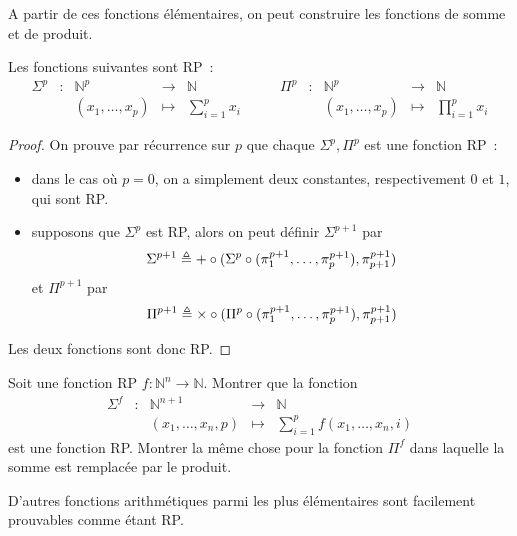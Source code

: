 A partir de ces fonctions élémentaires, on peut construire les fonctions de
somme et de produit.

\begin{proposition}
  Les fonctions suivantes sont RP~:
  \[
  \begin{array}{ccccc}
    \Sigma^p &: & \mathbb N^p &\longrightarrow & \mathbb N \\
    & & (x_1,\ldots,x_p) &\longmapsto & \sum_{i = 1}^p x_i
  \end{array}\qquad
  \begin{array}{ccccc}
    \Pi^p &: & \mathbb N^p &\longrightarrow & \mathbb N\\
    & & (x_1,\ldots,x_p) &\longmapsto & \prod_{i = 1}^p x_i
  \end{array}
  \]
\end{proposition}

\begin{proof}
  On prouve par récurrence sur $p$ que chaque $\Sigma^p,\Pi^p$ est une fonction
  RP~:
  \begin{itemize}
  \item dans le cas où $p = 0$, on a simplement deux constantes, respectivement
    $0$ et $1$, qui sont RP.
  \item supposons que $\Sigma^p$ est RP, alors on peut définir $\Sigma^{p+1}$
    par
    \[\Sigma^{p+1} \triangleq +\circ
    (\Sigma^p \circ (\pi_1^{p+1},\ldots,\pi_p^{p+1}),
    \pi_{p+1}^{p+1})\]
    et $\Pi^{p+1}$ par
    \[\Pi^{p+1}\triangleq \times\circ
    (\Pi^p \circ (\pi_1^{p+1},\ldots,\pi_p^{p+1}),
    \pi_{p+1}^{p+1})\]
  \end{itemize}
  Les deux fonctions sont donc RP.
\end{proof}

\begin{exercise}
  Soit une fonction RP $f : \mathbb N^n \to \mathbb N$. Montrer que la
  fonction
  \[\begin{array}{ccccc}
  \Sigma^f &: &\mathbb N^{n+1} &\longrightarrow & \mathbb N\\
  & & (x_1,\ldots,x_n,p) &\longmapsto & \sum_{i = 1}^p f(x_1,\ldots,x_n,i)
  \end{array}\]
  est une fonction RP. Montrer la même chose pour la fonction $\Pi^f$ dans
  laquelle la somme est remplacée par le produit.
\end{exercise}

D'autres fonctions arithmétiques parmi les plus élémentaires sont facilement
prouvables comme étant RP.

